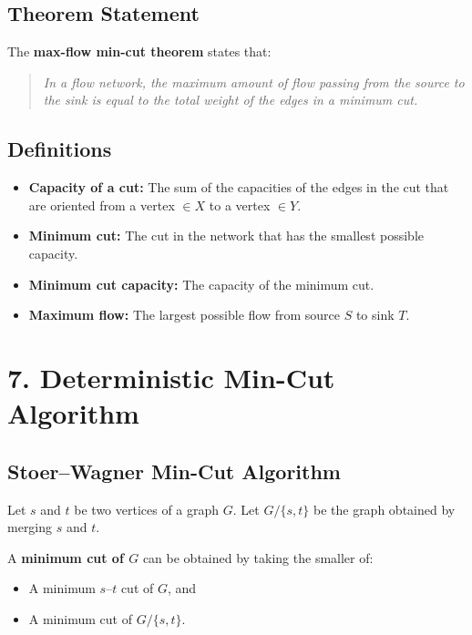 \documentclass[12pt]{article}
\begin{document}
\subsection*{Theorem Statement}

The \textbf{max-flow min-cut theorem} states that:

\begin{quote}
\emph{In a flow network, the maximum amount of flow passing from the source to the sink is equal to the total weight of the edges in a minimum cut.}
\end{quote}

\subsection*{Definitions}

\begin{itemize}
    \item \textbf{Capacity of a cut:}  
    The sum of the capacities of the edges in the cut that are oriented from a vertex \( \in X \) to a vertex \( \in Y \).

    \item \textbf{Minimum cut:}  
    The cut in the network that has the smallest possible capacity.

    \item \textbf{Minimum cut capacity:}  
    The capacity of the minimum cut.

    \item \textbf{Maximum flow:}  
    The largest possible flow from source \( S \) to sink \( T \).
\end{itemize}

\section*{7. Deterministic Min-Cut Algorithm}

\subsection*{Stoer–Wagner Min-Cut Algorithm}

Let \( s \) and \( t \) be two vertices of a graph \( G \).  
Let \( G / \{s, t\} \) be the graph obtained by merging \( s \) and \( t \).

A \textbf{minimum cut of \( G \)} can be obtained by taking the smaller of:

\begin{itemize}
    \item A minimum \( s\text{–}t \) cut of \( G \), and
    \item A minimum cut of \( G / \{s, t\} \).
\end{itemize}
\end{document}

